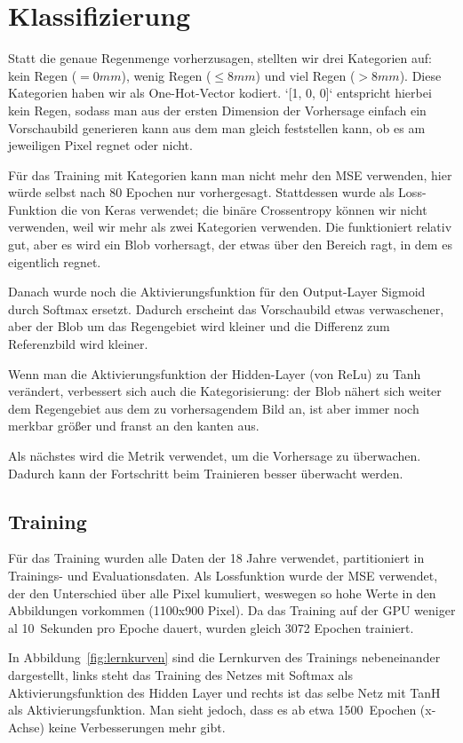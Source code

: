 \section{Klassifizierung}
Statt die genaue Regenmenge vorherzusagen, stellten wir drei Kategorien auf: kein Regen ($= 0mm$), wenig Regen ($\leq 8mm$) und viel Regen ($> 8mm$). Diese Kategorien haben wir als One-Hot-Vector kodiert. `[1, 0, 0]` entspricht hierbei kein Regen, sodass man aus der ersten Dimension der Vorhersage einfach ein Vorschaubild generieren kann aus dem man gleich feststellen kann, ob es am jeweiligen Pixel regnet oder nicht.

Für das Training mit Kategorien kann man nicht mehr den MSE verwenden, hier würde selbst nach 80 Epochen nur  vorhergesagt. Stattdessen wurde als Loss-Funktion die  von Keras verwendet; die binäre Crossentropy können wir nicht verwenden, weil wir mehr als zwei Kategorien verwenden. Die  funktioniert relativ gut, aber es wird ein Blob vorhersagt, der etwas über den Bereich ragt, in dem es eigentlich regnet.

Danach wurde noch die Aktivierungsfunktion für den Output-Layer Sigmoid durch Softmax ersetzt. Dadurch erscheint das Vorschaubild etwas verwaschener, aber der Blob um das Regengebiet wird kleiner und die Differenz zum Referenzbild wird kleiner.

Wenn man die Aktivierungsfunktion der Hidden-Layer (von ReLu) zu Tanh verändert, verbessert sich auch die Kategorisierung: der Blob nähert sich weiter dem Regengebiet aus dem zu vorhersagendem Bild an, ist aber immer noch merkbar größer und franst an den kanten aus.

Als nächstes wird die Metrik  verwendet, um die Vorhersage zu überwachen. Dadurch kann der Fortschritt beim Trainieren besser überwacht werden.


\subsection{Training}
Für das Training wurden alle Daten der 18 Jahre verwendet, partitioniert in Trainings- und Evaluationsdaten. Als Lossfunktion wurde der MSE verwendet, der den Unterschied über alle Pixel kumuliert, weswegen so hohe Werte in den Abbildungen vorkommen (1100x900 Pixel). Da das Training auf der GPU weniger al 10~Sekunden pro Epoche dauert, wurden gleich 3072 Epochen trainiert.

In Abbildung~\ref{fig:lernkurven} sind die Lernkurven des Trainings nebeneinander dargestellt, links steht das Training des Netzes mit Softmax als Aktivierungsfunktion des Hidden Layer und rechts ist das selbe Netz mit TanH als Aktivierungsfunktion. Man sieht jedoch, dass es ab etwa 1500~Epochen (x-Achse) keine Verbesserungen mehr gibt.

